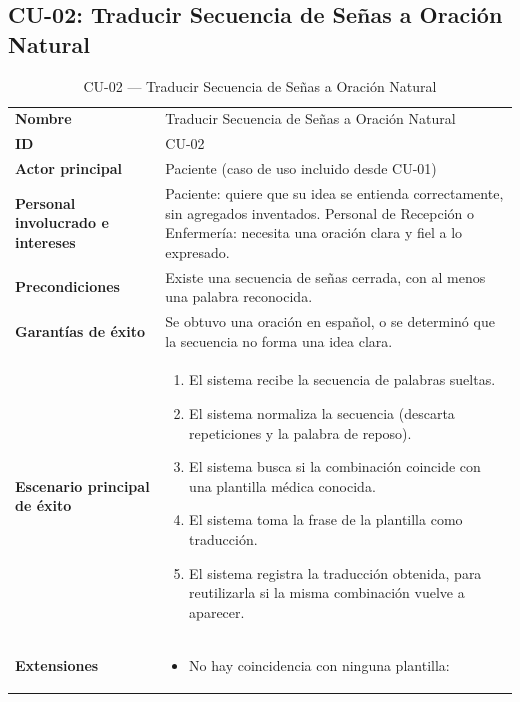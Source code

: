 \subsection{CU-02: Traducir Secuencia de Señas a Oración Natural}

\begin{longtable}{@{}>{\raggedright\arraybackslash}p{4.1cm} >{\raggedright\arraybackslash}p{\dimexpr\textwidth-4.1cm-2\tabcolsep\relax}@{}}
\caption{CU-02 --- Traducir Secuencia de Señas a Oración Natural}\\
\toprule
\textbf{Nombre} & Traducir Secuencia de Señas a Oración Natural \\
\textbf{ID} & CU-02 \\
\textbf{Actor principal} & Paciente (caso de uso incluido desde CU-01) \\
\textbf{Personal involucrado e intereses} &
Paciente: quiere que su idea se entienda correctamente, sin agregados
inventados. \newline
Personal de Recepción o Enfermería: necesita una oración clara y fiel a lo
expresado. \\
\textbf{Precondiciones} &
Existe una secuencia de señas cerrada, con al menos una palabra
reconocida. \\
\textbf{Garantías de éxito} &
Se obtuvo una oración en español, o se determinó que la secuencia no
forma una idea clara. \\
\textbf{Escenario principal de éxito} &
\begin{enumerate}[leftmargin=*, itemsep=2pt]
    \item El sistema recibe la secuencia de palabras sueltas.
    \item El sistema normaliza la secuencia (descarta repeticiones y la
    palabra de reposo).
    \item El sistema busca si la combinación coincide con una plantilla
    médica conocida.
    \item El sistema toma la frase de la plantilla como traducción.
    \item El sistema registra la traducción obtenida, para reutilizarla si
    la misma combinación vuelve a aparecer.
\end{enumerate} \\
\textbf{Extensiones} &
\begin{itemize}[leftmargin=*, itemsep=2pt]
    \item[3a.] No hay coincidencia con ninguna plantilla:

\end{itemize}
\end{longtable}
